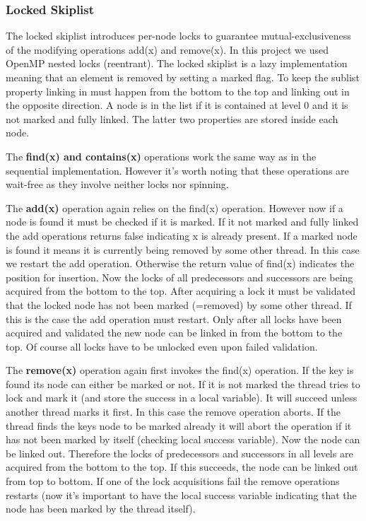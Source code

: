 \documentclass{article}
\begin{document}
\subsubsection{Locked Skiplist}
The locked skiplist introduces per-node locks to guarantee mutual-exclusiveness of the modifying operations add(x) and remove(x). In this project we used OpenMP nested locks (reentrant). The locked skiplist is a lazy implementation meaning that an element is removed by setting a marked flag. To keep the sublist property linking in must happen from the bottom to the top and linking out in the opposite direction. A node is in the list if it is contained at level 0 and it is not marked and fully linked. The latter two properties are stored inside each node. \par \medskip

\noindent The \textbf{find(x) and contains(x)} operations work the same way as in the sequential implementation. However it's worth noting that these operations are wait-free as they involve neither locks nor spinning. \par \medskip 

\noindent The \textbf{add(x)} operation again relies on the find(x) operation. However now if a node is found it must be checked if it is marked. If it not marked and fully linked the add operations returns false indicating x is already present. If a marked node is found it means it is currently being removed by some other thread. In this case we restart the add operation. Otherwise the return value of find(x) indicates the position for insertion. Now the locks of all predecessors and successors are being acquired from the bottom to the top. After acquiring a lock it must be validated that the locked node has not been marked (=removed) by some other thread. If this is the case the add operation must restart. Only after all locks have been acquired and validated the new node can be linked in from the bottom to the top. Of course all locks have to be unlocked even upon failed validation. \par \medskip

\noindent The \textbf{remove(x)} operation again first invokes the find(x) operation. If the key is found its node can either be marked or not.  If it is not marked the thread tries to lock and mark it (and store the success in a local variable). It will succeed unless another thread marks it first. In this case the remove operation aborts. If the thread finds the keys node to be marked already it will abort the operation if it has not been marked by itself (checking local success variable). Now the node can be linked out. Therefore the locks of predecessors and successors in all levels are acquired from the bottom to the top. If this succeeds, the node can be linked out from top to bottom. If one of the lock acquisitions fail the remove operations restarts (now it's important to have the local success variable indicating that the node has been marked by the thread itself). 
\medskip
\end{document}
